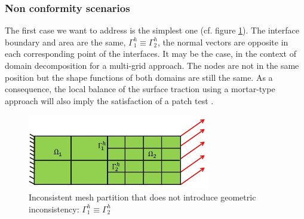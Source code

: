  \subsubsection{Non conformity scenarios}\label{sssec321}
 The first case we want to address is the simplest one (cf. figure \ref{fig.4}). The interface boundary and area are the same, $\Gamma_1^{h} \equiv \Gamma_2^{h} $, the normal vectors are opposite in each corresponding point of the interfaces. It may be the case, in the context of domain decomposition for a multi-grid approach. The nodes are not in the same position but the shape functions of both domains are still the same. As a consequence, the local balance of the surface traction using a mortar-type approach will also imply the satisfaction of a patch test \cite{park2002simpl}.
 \\
 \begin{figure}[ht]
 \centering
 \includegraphics[width=8cm]{images/Ch1/Mesh_inconsist_1}
 \caption{Inconsistent mesh partition that does not introduce geometric inconsistency: $\Gamma_1^{h} \equiv \Gamma_2^{h} $}  
 \label{fig.4}
 \end{figure}
 
